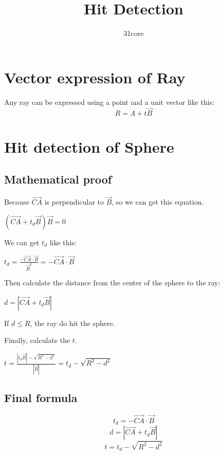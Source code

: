 \documentclass{article}
\begin{document}
\title{Hit Detection}
\author{31core}
\maketitle
\newpage
\tableofcontents
\newpage
\setlength{\parindent}{0em}
\section{Vector expression of Ray}
Any ray can be expressed using a point and a unit vector like this:
\begin{equation}
R = A + t\vec{B}
\end{equation}

\section{Hit detection of Sphere}
\subsection{Mathematical proof}
Because $\vec{CA}$ is perpendicular to $\vec{B}$, so we can get this equation.

$(\vec{CA} + t_d\vec{B})\vec{B} = 0$

We can get $t_d$ like this:

$t_d = \frac{ - \vec{CA} \cdot \vec{B} }{ \vec{B}^2 } = -\vec{CA} \cdot  \vec{B}$

Then calculate the distance from the center of the sphere to the ray:

$d = |\vec{CA} + t_d\vec{B}|$

If $d \le R$, the ray do hit the sphere.

Finally, calculate the $t$.

$t = \frac{|t_d\vec{B}| - \sqrt{R^2 - d^2}}{|\vec{B}|} = t_d - \sqrt{R^2 - d^2}$

\subsection{Final formula}
\begin{equation}
t_d = -\vec{CA} \cdot  \vec{B}
\end{equation}
\begin{equation}
d = |\vec{CA} + t_d\vec{B}|
\end{equation}
\begin{equation}
t = t_d - \sqrt{R^2 - d^2}
\end{equation}
\end{document}
